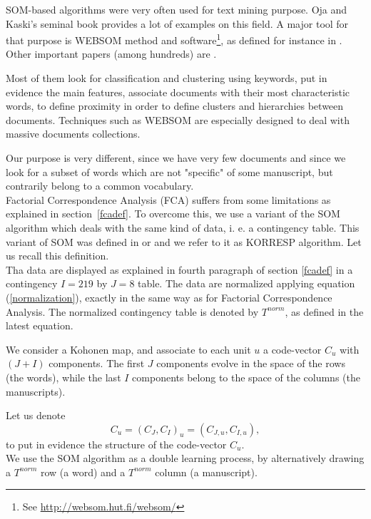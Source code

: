 \documentclass[preprint]{elsarticle}
\begin{document}
SOM-based algorithms were very often used for text mining purpose. Oja and Kaski's seminal book \cite{oja99} provides a lot of examples on this field. A major tool for that purpose is WEBSOM method and software\footnote{See \url{http://websom.hut.fi/websom/}}, as defined for instance in \cite{kohonen99,lagus99,lagus04}. Other important papers (among hundreds) are \cite{rauber03,yang04,honkela}.

Most of them look for classification and clustering using keywords, put in evidence the main features, associate documents with their most characteristic words, to define proximity in order to define clusters and hierarchies between documents. Techniques such as WEBSOM are especially designed to deal with massive documents collections.

Our purpose is very different, since we have very few documents and since we look for a subset of words which are not "specific" of some manuscript, but contrarily belong to a common vocabulary.\\

Factorial Correspondence Analysis (FCA) suffers from some limitations as explained in section~\ref{fcadef}. To overcome this, we use a variant of the SOM algorithm which deals with the same kind of data, i. e. a contingency table. This variant of SOM was defined in  \cite{cottrell98} or \cite{cottrell05} and we refer to it as  KORRESP algorithm. Let us recall this definition.\\

Tha data are displayed as explained in fourth paragraph of section \ref{fcadef} in a contingency $I=219$ by $J=8$ table. The data are normalized applying equation (\ref{normalization}), exactly in the same way as for Factorial Correspondence Analysis. The normalized contingency table is denoted by $T^{norm}$, as defined in the latest equation.

We consider a Kohonen map, and associate to each unit $u$ a code-vector $C_u$ with $(J+I)$ components. The first $J$ components evolve in the space of the rows (the words), while the last $I$ components belong to the space of the columns (the manuscripts).

Let us denote 
\begin{equation}
C_u = (C_J, C_I)_u = (C_{J,u}, C_{I,u}),
\end{equation}
to put in evidence the structure of the code-vector $C_u$.\\

We use the SOM algorithm as a double learning process, by alternatively drawing a $T^{norm}$ row (a word) and a $T^{norm}$ column (a manuscript).
\end{document}
